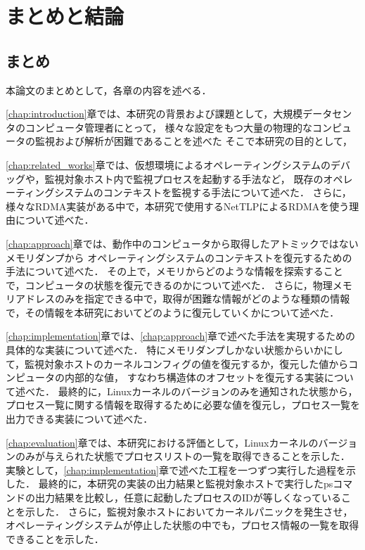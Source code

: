 \chapter{まとめと結論}
\label{chap:conclusion}

\section{まとめ}

本論文のまとめとして，各章の内容を述べる．

\ref{chap:introduction}章では、本研究の背景および課題として，大規模データセンタのコンピュータ管理者にとって，
様々な設定をもつ大量の物理的なコンピュータの監視および解析が困難であることを述べた
そこで本研究の目的として，

\ref{chap:related_works}章では、仮想環境によるオペレーティングシステムのデバッグや，監視対象ホスト内で監視プロセスを起動する手法など，
既存のオペレーティングシステムのコンテキストを監視する手法について述べた．
さらに，様々なRDMA実装がある中で，本研究で使用するNetTLPによるRDMAを使う理由について述べた．

\ref{chap:approach}章では、動作中のコンピュータから取得したアトミックではないメモリダンプから
オペレーティングシステムのコンテキストを復元するための手法について述べた．
その上で，メモリからどのような情報を探索することで，コンピュータの状態を復元できるのかについて述べた．
さらに，物理メモリアドレスのみを指定できる中で，取得が困難な情報がどのような種類の情報で，その情報を本研究においてどのように復元していくかについて述べた．

\ref{chap:implementation}章では、\ref{chap:approach}章で述べた手法を実現するための具体的な実装について述べた．
特にメモリダンプしかない状態からいかにして，監視対象ホストのカーネルコンフィグの値を復元するか，復元した値からコンピュータの内部的な値，
すなわち構造体のオフセットを復元する実装について述べた．
最終的に，Linuxカーネルのバージョンのみを通知された状態から，プロセス一覧に関する情報を取得するために必要な値を復元し，プロセス一覧を出力できる実装について述べた．

\ref{chap:evaluation}章では、本研究における評価として，Linuxカーネルのバージョンのみが与えられた状態でプロセスリストの一覧を取得できることを示した．
実験として，\ref{chap:implementation}章で述べた工程を一つずつ実行した過程を示した．
最終的に，本研究の実装の出力結果と監視対象ホストで実行したpsコマンドの出力結果を比較し，任意に起動したプロセスのIDが等しくなっていることを示した．
さらに，監視対象ホストにおいてカーネルパニックを発生させ，オペレーティングシステムが停止した状態の中でも，プロセス情報の一覧を取得できることを示した．

